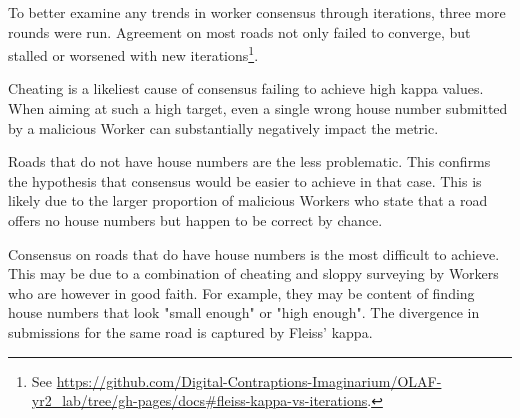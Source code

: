 To better examine any trends in worker consensus through iterations, three more rounds were run. Agreement on most roads not only failed to converge, but stalled or worsened with new iterations\footnote{See \url{https://github.com/Digital-Contraptions-Imaginarium/OLAF-yr2_lab/tree/gh-pages/docs#fleiss-kappa-vs-iterations}.}. 

Cheating is a likeliest cause of consensus failing to achieve high kappa values. When aiming at such a high target, even a single wrong house number submitted by a malicious Worker can substantially negatively impact the metric.

Roads that do not have house numbers are the less problematic. This confirms the hypothesis that consensus would be easier to achieve in that case. This is likely due to the larger proportion of malicious Workers who state that a road offers no house numbers but happen to be correct by chance.

Consensus on roads that do have house numbers is the most difficult to achieve. This may be due to a combination of cheating and sloppy surveying by Workers who are however in good faith. For example, they may be content of finding house numbers that look "small enough" or "high enough". The divergence in submissions for the same road is captured by Fleiss' kappa.